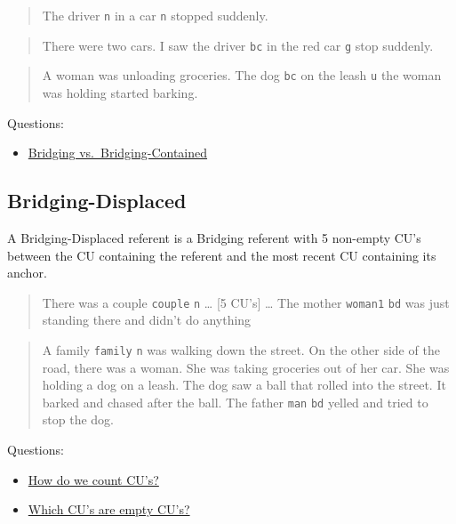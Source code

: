 \documentclass[
]{book}
\providecommand{\tightlist}{%
  \setlength{\itemsep}{0pt}\setlength{\parskip}{0pt}}
\begin{document}
\begin{quote}
The driver \texttt{n} in a car \texttt{n} stopped suddenly.
\end{quote}

\begin{quote}
There were two cars. I saw the driver \texttt{bc} in the red car \texttt{g} stop suddenly.
\end{quote}

\begin{quote}
A woman was unloading groceries.
The dog \texttt{bc} on the leash \texttt{u} the woman was holding started barking.
\end{quote}

Questions:

\begin{itemize}
\tightlist
\item
  \protect\hyperlink{bridging-vs.-bridging-contained}{Bridging vs.~Bridging-Contained}
\end{itemize}

\hypertarget{bridging-displaced}{%
\subsection{Bridging-Displaced}\label{bridging-displaced}}

A Bridging-Displaced referent is a Bridging referent with 5 non-empty CU's between the CU containing the referent and the most recent CU containing its anchor.

\begin{quote}
There was a couple \texttt{couple} \texttt{n} \ldots{}
{[}5 CU's{]} \ldots{}
The mother \texttt{woman1} \texttt{bd} was just standing there and didn't do anything
\end{quote}

\begin{quote}
A family \texttt{family} \texttt{n} was walking down the street.
On the other side of the road, there was a woman.
She was taking groceries out of her car.
She was holding a dog on a leash.
The dog saw a ball that rolled into the street.
It barked and chased after the ball.
The father \texttt{man} \texttt{bd} yelled and tried to stop the dog.
\end{quote}

Questions:

\begin{itemize}
\tightlist
\item
  \protect\hyperlink{counting-cus}{How do we count CU's?}
\item
  \protect\hyperlink{empty-cus}{Which CU's are empty CU's?}
\end{itemize}
\end{document}

